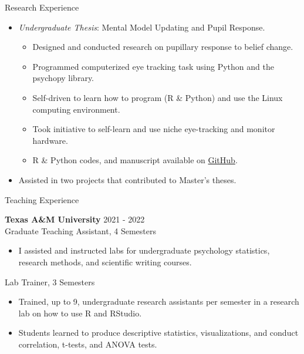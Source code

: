 \documentclass{resume} %
\begin{document}
\begin{rSection}{Research Experience}
\begin{itemize}[nosep]
        \item \emph{Undergraduate Thesis}: 
        Mental Model Updating and Pupil Response.
            \begin{itemize}
                \item Designed and conducted research on pupillary response to 
                belief change.
                \item Programmed computerized eye tracking task using Python and the psychopy library.
                \item Self-driven to learn how to program (R \& Python) and use the Linux computing environment.
                \item Took initiative to self-learn and use niche eye-tracking and monitor hardware.
                \item R \& Python codes, and manuscript available on \href{https://github.com/sjp117/Undergrad_Projects/tree/master/mentalModelUpdatingPupil}{GitHub}.
            \end{itemize}
        \item Assisted in two projects that contributed to Master's theses.
        
    \end{itemize}
    
\end{rSection}

\break

\begin{rSection}{Teaching Experience}
    
    {\bf {Texas A\&M University}}
    \hfill {2021 - 2022}
    \\Graduate Teaching Assistant, 4 Semesters
    
    \begin{itemize}[nosep]
        
        \item I assisted and instructed labs for undergraduate
        psychology statistics, research methods, and scientific
        writing courses.
        
    \end{itemize}

    Lab Trainer, 3 Semesters
    
    \begin{itemize}[nosep]
        
        \item Trained, up to 9, undergraduate research assistants per 
        semester in a research lab on how to use R and RStudio.
        \item Students learned to produce descriptive statistics, visualizations, and conduct correlation, t-tests, and ANOVA tests.
        
    \end{itemize}
    
\end{rSection}
\end{document}
